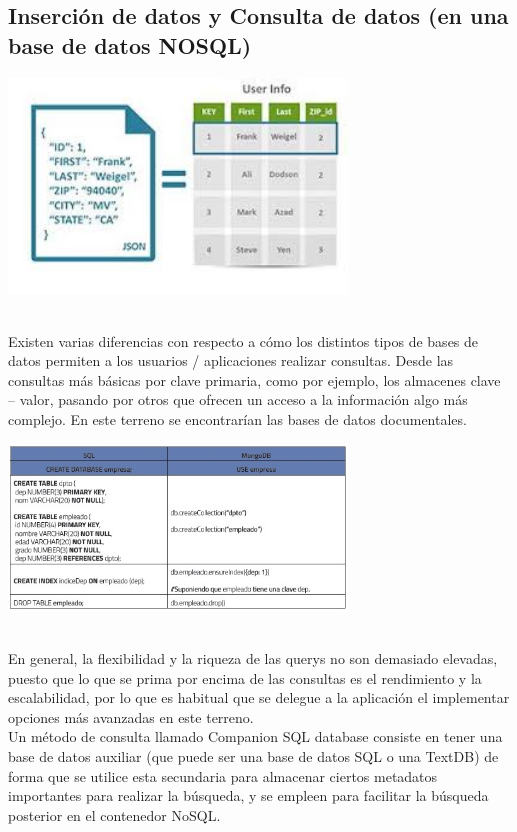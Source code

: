 \documentclass[twoside,onecolumn]{article}
\begin{document}
\begin{flushright}
\begin{itemize}
\subsection{Inserción de datos y Consulta de datos (en una base de datos NOSQL)}
\begin{center}
		\includegraphics[width=9cm]{./Imagenes/6}
		\end{center}	
\textbf{}\\
Existen varias diferencias con respecto a cómo los distintos tipos de bases de datos permiten a los usuarios / aplicaciones realizar consultas. Desde las consultas más básicas por clave primaria, como por ejemplo, los almacenes clave – valor, pasando por otros que ofrecen un acceso a la información algo más complejo. En este terreno se encontrarían las bases de datos documentales.
\begin{center}
		\includegraphics[width=9cm]{./Imagenes/1}
		\end{center}	
\textbf{}\\
En general, la flexibilidad y la riqueza de las querys no son demasiado elevadas, puesto que lo que se prima por encima de las consultas es el rendimiento y la escalabilidad, por lo que es habitual que se delegue a la aplicación el implementar opciones más avanzadas en este terreno.
\textbf{}\\
Un método de consulta llamado Companion SQL database consiste en tener una base de datos auxiliar (que puede ser una base de datos SQL o una TextDB) de forma que se utilice esta secundaria para almacenar ciertos metadatos importantes para realizar la búsqueda, y se empleen para facilitar la búsqueda posterior en el contenedor NoSQL.

\end{itemize}
\end{flushright}
\end{document}
